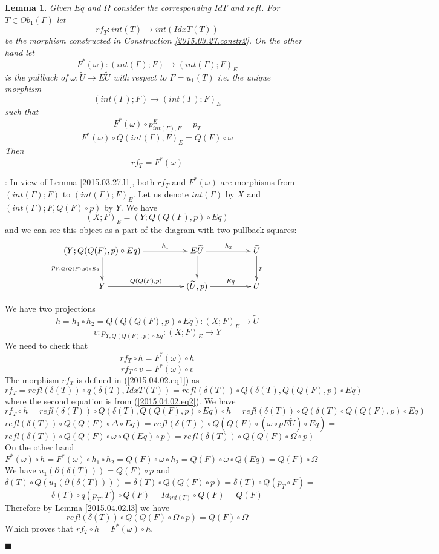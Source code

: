 \documentclass[12pt]{article}
\numberwithin{equation}{section}
\newenvironment{myproof}{{\bf Proof}:}{$\blacksquare$ \vskip 5mm }
\newtheorem{lemma}[proposition]{Lemma}
\newcommand{\llabel}[1]{\label{#1}}
\newcommand{\sr}{\rightarrow}
\newcommand{\wt}{\widetilde}
\begin{document}
\begin{lemma}
\llabel{2015.03.31.l2} Given $Eq$ and $\Omega$ consider the corresponding $IdT$
and $refl$. For $T\in Ob_1(\Gamma)$ let %
$$rf_T:int(T)\sr int(IdxT(T))$$
%
be the morphism constructed in Construction \ref{2015.03.27.constr2}. On the
other hand let
%
$$F^*(\omega):(int(\Gamma);F)\sr (int(\Gamma);F)_{E}$$
%
is the pullback of $\omega:\wt{U}\sr E\wt{U}$ with respect to $F=u_1(T)$
i.e. the unique morphism
%
$$(int(\Gamma);F)\sr (int(\Gamma);F)_{E}$$
%
such that
%
$$F^*(\omega)\circ p^{E}_{int(\Gamma),F}=p_{T}$$
$$F^*(\omega)\circ Q(int(\Gamma),F)_{E}=Q(F)\circ \omega$$
%
Then
%
$$rf_T=F^*(\omega)$$
%
\end{lemma}
%
\begin{myproof}
In view of Lemma \ref{2015.03.27.l1}, both $rf_T$ and $F^*(\omega)$ are
morphisms from $(int(\Gamma);F)$ to $(int(\Gamma);F)_{E}$. Let us denote
$int(\Gamma)$ by $X$ and $(int(\Gamma);F,Q(F)\circ p)$ by $Y$. We have
%
$$(X;F)_{E}=(Y;Q(Q(F),p)\circ Eq)$$
%
and we can see this object as a part of the diagram with two pullback squares:
%
$$
\begin{xy}
          \xymatrix@C=4pc{ (Y;Q(Q(F),p)\circ Eq) \ar[r]^-{h_1} \ar[d]_{p_{Y,
                Q(Q(F),p)\circ Eq}} & E\wt{U} \ar[r]^-{h_2} \ar[d] & \wt{U}
            \ar[d]^{p} \\ Y \ar[r]^-{Q(Q(F),p)} & (\wt{U},p) \ar[r]^-{Eq} & U }
\end{xy}
$$

%
We have two projections
%
$$h=h_1\circ h_2=Q(Q(Q(F),p)\circ Eq):(X;F)_{E}\sr \wt{U}$$
$$v:p_{Y,Q(Q(F),p)\circ Eq}:(X;F)_{E} \sr Y$$
%
We need to check that
%
$$rf_T\circ h=F^*(\omega)\circ h$$
$$rf_T\circ v =F^*(\omega)\circ v$$
%
The morphism $rf_T$ is defined in (\ref{2015.04.02.eq1}) as
%
$$rf_T=refl(\delta(T))\circ q(\delta(T),IdxT(T))=refl(\delta(T))\circ
Q(\delta(T),Q(Q(F),p)\circ Eq)$$
%
where the second equation is from (\ref{2015.04.02.eq2}).
%
We have
%
$$rf_T\circ h = refl(\delta(T))\circ Q(\delta(T),Q(Q(F),p)\circ Eq)\circ
h=refl(\delta(T))\circ Q(\delta(T)\circ Q(Q(F),p)\circ
Eq)=$$$$refl(\delta(T))\circ Q(Q(F)\circ \Delta\circ Eq)=refl(\delta(T))\circ
Q(Q(F)\circ (\omega\circ pE\wt{U})\circ Eq)=$$
$$refl(\delta(T))\circ Q(Q(F)\circ \omega\circ Q(Eq)\circ
p)=refl(\delta(T))\circ Q(Q(F)\circ \Omega\circ p)$$
%
On the other hand
%
$$F^*(\omega)\circ h=F^*(\omega)\circ h_1\circ h_2=Q(F)\circ \omega\circ
h_2=Q(F)\circ \omega\circ Q(Eq)=Q(F)\circ \Omega$$
%
We have $u_1(\partial(\delta(T)))=Q(F)\circ p$ and
%
$$\delta(T)\circ Q(u_1(\partial(\delta(T))))=\delta(T)\circ Q(Q(F)\circ p)=
\delta(T)\circ Q(p_T\circ F)=$$
$$\delta(T)\circ q(p_T,T)\circ Q(F)=Id_{int(T)}\circ Q(F)=Q(F)$$
%
Therefore by Lemma \ref{2015.04.02.l3} we have
%
$$refl(\delta(T))\circ Q(Q(F)\circ \Omega\circ p)=Q(F)\circ \Omega$$
%
Which proves that $rf_T\circ h=F^*(\omega)\circ h$.


\end{myproof}
\end{document}
